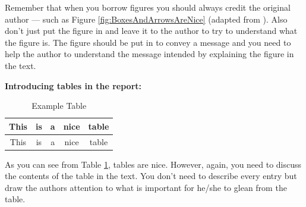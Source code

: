 Remember that when you borrow figures you should always credit the original author --- such as Figure \ref{fig:BoxesAndArrowsAreNice} (adapted from \citet{authorson10:_secon_best_paper_in_world}). Also don't just put the figure in and leave it to the author to try to understand what the figure is. The figure should be put in to convey a message and you need to help the author to understand the message intended by explaining the figure in the text. 

\vspace{0.5cm}

\noindent
{\bf Introducing tables in the report: }\\

\begin{table}[htbp]
\begin{center}
\begin{tabular}{|c|c|c|c|c|}\hline\hline
This & is & a & nice & table\\\hline
This & is & a & nice & table\\\hline\hline
\end{tabular}
\caption{Example Table}
\end{center}
\label{tab:ExampleTable}
\end{table}%

As you can see from Table \ref{tab:ExampleTable}, tables are nice. However, again, you need to discuss the contents of the table in the text. You don't need to describe every entry but draw the authors attention to what is important for he/she to glean from the table. 
\fi


